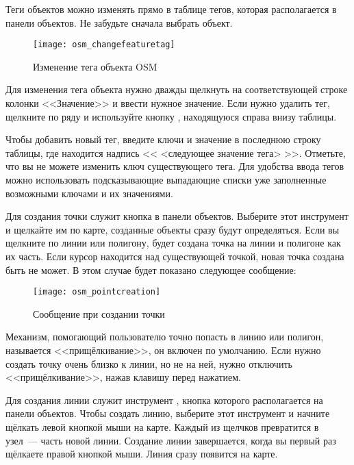 
Теги объектов можно изменять прямо в таблице тегов, которая
располагается в панели объектов. Не забудьте сначала выбрать объект.

\begin{figure}[ht]
   \centering
   \texttt{[image: osm\_changefeaturetag]}
   \caption{Изменение тега объекта OSM \wincaption}\label{fig:osmchfeattag}
\end{figure}

Для изменения тега объекта нужно дважды щелкнуть на соответствующей
строке колонки <<Значение>> и ввести нужное значение. Если нужно удалить
тег, щелкните по ряду и используйте кнопку ,
находящуюся справа внизу таблицы.

Чтобы добавить новый тег, введите ключи и значение в последнюю строку
таблицы, где находится надпись << <следующее значение тега> >>. Отметьте,
что вы не можете изменить ключ существующего тега. Для удобства ввода
тегов можно использовать подсказывающие выпадающие списки уже заполненные
возможными ключами и их значениями.


Для создания точки служит кнопка 
в панели объектов. Выберите этот инструмент и щелкайте им по карте, созданные
объекты сразу будут определяться. Если вы щелкните по линии или полигону,
будет создана точка на линии и полигоне как их часть. Если курсор находится
над существующей точкой, новая точка создана быть не может. В этом случае
будет показано следующее сообщение:

\begin{figure}[ht]
   \centering
   \texttt{[image: osm\_pointcreation]}
   \caption{Сообщение при создании точки \wincaption}\label{fig:osmpoicreat}
\end{figure}

Механизм, помогающий пользователю точно попасть в линию или полигон,
называется <<прищёлкивание>>, он включен по умолчанию. Если нужно создать
точку очень близко к линии, но не на ней, нужно отключить <<прищёлкивание>>,
нажав клавишу  перед нажатием.


Для создания линии служит инструмент ,
кнопка которого располагается на панели объектов. Чтобы создать линию,
выберите этот инструмент и начните щёлкать левой кнопкой мыши на карте.
Каждый из щелчков превратится в узел~--- часть новой линии. Создание
линии завершается, когда вы первый раз щёлкаете правой кнопкой мыши.
Линия сразу появится на карте.

